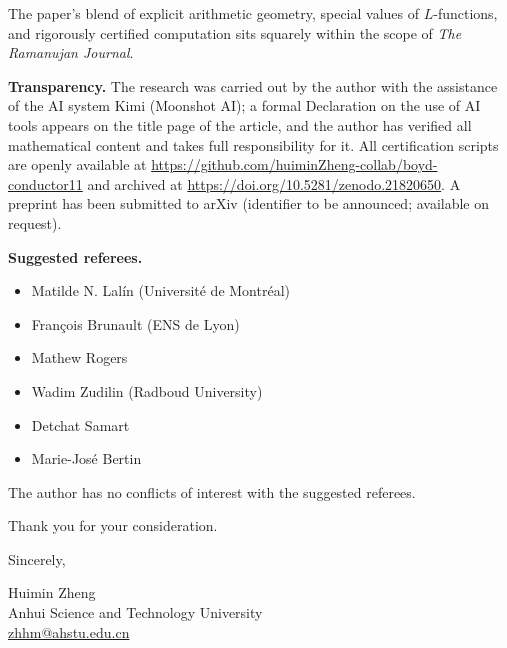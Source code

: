 \documentclass[11pt]{article}
\begin{document}
The paper's blend of explicit arithmetic geometry, special values of
$L$-functions, and rigorously certified computation sits squarely
within the scope of \emph{The Ramanujan Journal}.

\textbf{Transparency.} The research was carried out by the author with
the assistance of the AI system Kimi (Moonshot AI); a formal
Declaration on the use of AI tools appears on the title page of the
article, and the author has verified all mathematical content and
takes full responsibility for it. All certification scripts are openly
available at \url{https://github.com/huiminZheng-collab/boyd-conductor11}
and archived at \url{https://doi.org/10.5281/zenodo.21820650}. A
preprint has been submitted to arXiv (identifier to be announced;
available on request).

\textbf{Suggested referees.}
\begin{itemize}
\item Matilde N. Lal\'in (Universit\'e de Montr\'eal)
\item Fran\c{c}ois Brunault (ENS de Lyon)
\item Mathew Rogers
\item Wadim Zudilin (Radboud University)
\item Detchat Samart
\item Marie-Jos\'e Bertin
\end{itemize}
The author has no conflicts of interest with the suggested referees.

Thank you for your consideration.

\vspace{2em}
Sincerely,

Huimin Zheng\\
Anhui Science and Technology University\\
\url{zhhm@ahstu.edu.cn}
\end{document}
